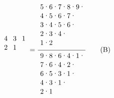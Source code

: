 \documentclass[a4paper,11pt]{amsart}
\begin{document}
\begin{equation}
{\begin{tikzpicture}[yscale=-0.45, xscale=0.45]
				\node at (0.5,3.5) {4};
				\node at (1.5,3.5) {3};
				\node at (2.5,3.5) {1};
				\node at (0.5,4.5) {2};
				\node at (1.5,4.5) {1};
			\end{tikzpicture}\hfill
		}
		=
		\dfrac{%
			\begin{tikzpicture}[yscale=-0.45, xscale=0.45]
				\node at (0.5,0.5) {5};
				\node at (1.5,0.5) {6};
				\node at (2.5,0.5) {7};
				\node at (3.5,0.5) {8};
				\node at (4.5,0.5) {9};
				\node at (0.5,1.5) {4};
				\node at (1.5,1.5) {5};
				\node at (2.5,1.5) {6};
				\node at (3.5,1.5) {7};
				\node at (0.5,2.5) {3};
				\node at (1.5,2.5) {4};
				\node at (2.5,2.5) {5};
				\node at (3.5,2.5) {6};
				\node at (0.5,3.5) {2};
				\node at (1.5,3.5) {3};
				\node at (2.5,3.5) {4};
				\node at (0.5,4.5) {1};
				\node at (1.5,4.5) {2};
				\node at (1,0.5) {$\cdot$};
				\node at (2,0.5) {$\cdot$};
				\node at (3,0.5) {$\cdot$};
				\node at (4,0.5) {$\cdot$};
				\node at (5,0.5) {$\cdot$};
				\node at (1,1.5) {$\cdot$};
				\node at (2,1.5) {$\cdot$};
				\node at (3,1.5) {$\cdot$};
				\node at (4,1.5) {$\cdot$};
				\node at (1,2.5) {$\cdot$};
				\node at (2,2.5) {$\cdot$};
				\node at (3,2.5) {$\cdot$};
				\node at (4,2.5) {$\cdot$};
				\node at (1,3.5) {$\cdot$};
				\node at (2,3.5) {$\cdot$};
				\node at (3,3.5) {$\cdot$};
				\node at (1,4.5) {$\cdot$};
			\end{tikzpicture}\hfill
		}
		{%
			\begin{tikzpicture}[yscale=-0.45, xscale=0.45]
				\node at (0.5,0.5) {9};
				\node at (1.5,0.5) {8};
				\node at (2.5,0.5) {6};
				\node at (3.5,0.5) {4};
				\node at (4.5,0.5) {1};
				\node at (0.5,1.5) {7};
				\node at (1.5,1.5) {6};
				\node at (2.5,1.5) {4};
				\node at (3.5,1.5) {2};
				\node at (0.5,2.5) {6};
				\node at (1.5,2.5) {5};
				\node at (2.5,2.5) {3};
				\node at (3.5,2.5) {1};
				\node at (0.5,3.5) {4};
				\node at (1.5,3.5) {3};
				\node at (2.5,3.5) {1};
				\node at (0.5,4.5) {2};
				\node at (1.5,4.5) {1};
				\node at (1,0.5) {$\cdot$};
				\node at (2,0.5) {$\cdot$};
				\node at (3,0.5) {$\cdot$};
				\node at (4,0.5) {$\cdot$};
				\node at (5,0.5) {$\cdot$};
				\node at (1,1.5) {$\cdot$};
				\node at (2,1.5) {$\cdot$};
				\node at (3,1.5) {$\cdot$};
				\node at (4,1.5) {$\cdot$};
				\node at (1,2.5) {$\cdot$};
				\node at (2,2.5) {$\cdot$};
				\node at (3,2.5) {$\cdot$};
				\node at (4,2.5) {$\cdot$};
				\node at (1,3.5) {$\cdot$};
				\node at (2,3.5) {$\cdot$};
				\node at (3,3.5) {$\cdot$};
				\node at (1,4.5) {$\cdot$};
			\end{tikzpicture}\hfill
		}\label{LHS}
		\tag{B}
		\end{equation}
\end{document}
